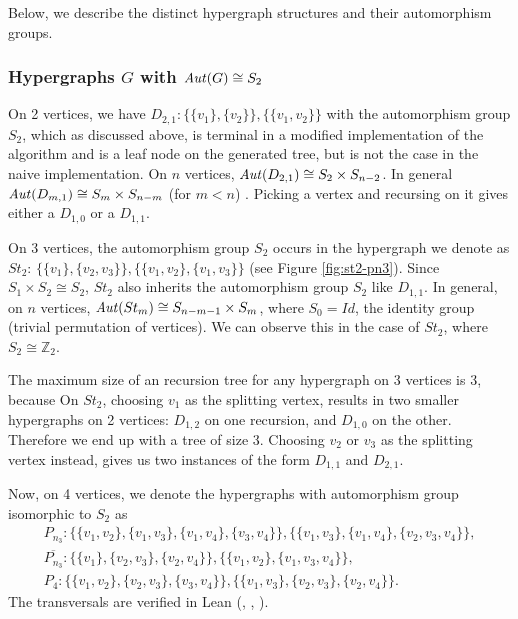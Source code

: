 Below, we describe the distinct hypergraph structures and their automorphism groups.

\subsubsection*{Hypergraphs $G$ with $\mathit{Aut}(G)\cong S_2$}

On 2 vertices, we have $D_{2,1}:\{\{v_1\},\{v_2\}\},\{\{v_1,v_2\}\}$ with the automorphism group $S_2$, which as discussed above, is terminal in a modified implementation of the algorithm and is a leaf node on the generated tree, but is not the case in the naive implementation. On $n$ vertices, $\mathit{Aut}(D_{2,1})\cong S_2\times S_{n-2}$. In general $\mathit{Aut}(D_{m,1})\cong S_m\times S_{n-m}$ (for $m<n$) . Picking a vertex and recursing on it gives either a $D_{1,0}$ or a $D_{1,1}$.  

On 3 vertices, the automorphism group $S_2$ occurs in the hypergraph we denote as $St_2$: $\{\{v_1\},\{v_2,v_3\}\},\{\{v_1,v_2\},\{v_1,v_3\}\}$ (see Figure \ref{fig:st2-pn3}). Since $S_1\times S_2\cong S_2$, $St_2$ also inherits the automorphism group $S_2$ like $D_{1,1}$. In general, on $n$ vertices, $\mathit{Aut}(St_m)\cong S_{n-m-1}\times S_m$, where $S_0=Id$, the identity group (trivial permutation of vertices). We can observe this in the case of $St_2$, where $S_2\cong\mathbb{Z}_2$.

The maximum size of an \FKA{} recursion tree for any hypergraph on 3 vertices is 3, because   On $St_2$, choosing $v_1$ as the splitting vertex, results in two smaller hypergraphs on 2 vertices: $D_{1,2}$ on one recursion, and $D_{1,0}$ on the other. Therefore we end up with a tree of size 3. Choosing $v_2$ or $v_3$ as the splitting vertex instead, gives us two instances of the form $D_{1,1}$ and $D_{2,1}$.

Now, on 4 vertices, we denote the hypergraphs with automorphism group isomorphic to $S_2$ as
\begin{gather*}
P_{n_3}:\{\{v_1,v_2\},\{v_1,v_3\},\{v_1,v_4\},\{v_3,v_4\}\},\{\{v_1,v_3\},\{v_1,v_4\},\{v_2,v_3,v_4\}\},\\[4pt]
\overline{P_{n_3}}:\{\{v_1\},\{v_2,v_3\},\{v_2,v_4\}\},\{\{v_1,v_2\},\{v_1,v_3,v_4\}\},\\[4pt]
P_4:\{\{v_1,v_2\},\{v_2,v_3\},\{v_3,v_4\}\},\{\{v_1,v_3\},\{v_2,v_3\},\{v_2,v_4\}\}.
\end{gather*}
The transversals are verified in Lean (, , ).

